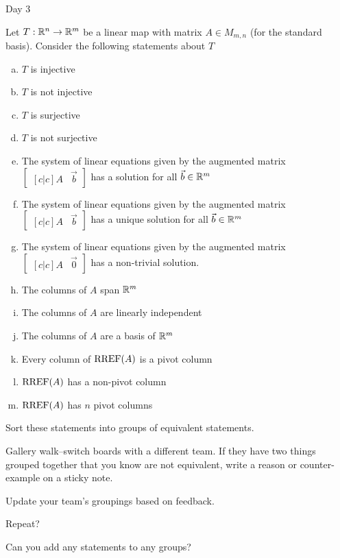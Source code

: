 \documentclass{article}[12pt]
\begin{document}
\begin{applicationActivities}{Day 3}

\begin{activity}
Let $T: \mathbb{R}^n \rightarrow \mathbb{R}^m$ be a linear map with matrix $A \in M_{m,n}$ (for the standard basis).  Consider the following statements about $T$
\begin{enumerate}[(a)]
\item $T$ is injective
\item $T$ is not injective
\item $T$ is surjective
\item $T$ is not surjective
\item The system of linear equations given by the augmented matrix $\begin{bmatrix}[c|c]A & \vec{b} \end{bmatrix}$ has a solution for all $\vec{b} \in \mathbb{R}^m$
\item The system of linear equations given by the augmented matrix $\begin{bmatrix}[c|c]A & \vec{b} \end{bmatrix}$ has a unique solution for all $\vec{b} \in \mathbb{R}^m$
\item The system of linear equations given by the augmented matrix $\begin{bmatrix}[c|c] A & \vec{0} \end{bmatrix}$ has a non-trivial solution.
\item The columns of $A$ span $\mathbb{R}^m$
\item The columns of $A$ are linearly independent
\item The columns of $A$ are a basis of $\mathbb{R}^m$
\item Every column of $\operatorname{RREF}(A)$ is a pivot column
\item $\operatorname{RREF}(A)$ has a non-pivot column
\item $\operatorname{RREF}(A)$ has $n$ pivot columns
\end{enumerate}
Sort these statements into groups of equivalent statements.
\end{activity}

\begin{activity}
Gallery walk--switch boards with a different team.  If they have two things grouped together that you know are not equivalent, write a reason or counter-example on a sticky note.
\end{activity}

\begin{activity}
Update your team's groupings based on feedback.
\end{activity}

\begin{activity}
Repeat?
\end{activity}

\begin{activity}
Can you add any statements to any groups?
\end{activity}

\end{applicationActivities}
\end{document}
